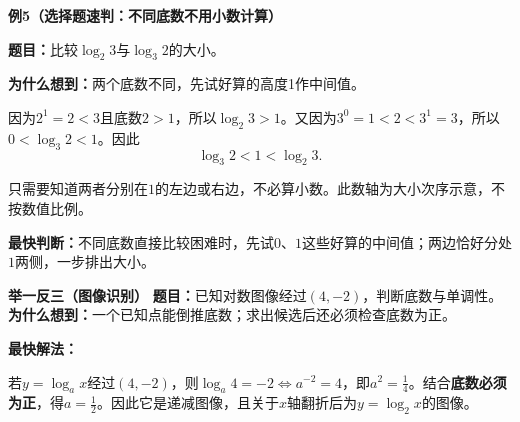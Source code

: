 \begin{examplebox}
\textbf{\textcolor{CExample}{例5（选择题速判：不同底数不用小数计算）}}

\textbf{题目：}比较$\log_2 3$与$\log_3 2$的大小。

\textbf{为什么想到：}两个底数不同，先试好算的高度1作中间值。


因为$2^1=2<3$且底数$2>1$，所以$\log_2 3>1$。又因为$3^0=1<2<3^1=3$，所以$0<\log_3 2<1$。因此
\[
 \boxed{\log_3 2<1<\log_2 3}.
\]

\begin{center}
\par\small 只需要知道两者分别在$1$的左边或右边，不必算小数。此数轴为大小次序示意，不按数值比例。
\end{center}

\textbf{最快判断：}不同底数直接比较困难时，先试$0$、$1$这些好算的中间值；两边恰好分处$1$两侧，一步排出大小。

\medskip

\end{examplebox}
\clearpage
\begin{examplebox}
\textbf{\textcolor{CExample}{举一反三（图像识别）}}
\textbf{题目：}已知对数图像经过$(4,-2)$，判断底数与单调性。
\textbf{为什么想到：}一个已知点能倒推底数；求出候选后还必须检查底数为正。


\textbf{最快解法：}

若$y=\log_a x$经过$(4,-2)$，则$\log_a4=-2\Longleftrightarrow a^{-2}=4$，即$a^2=\tfrac14$。结合\textbf{底数必须为正}，得$a=\tfrac12$。因此它是递减图像，且关于$x$轴翻折后为$y=\log_2x$的图像。
\end{examplebox}
